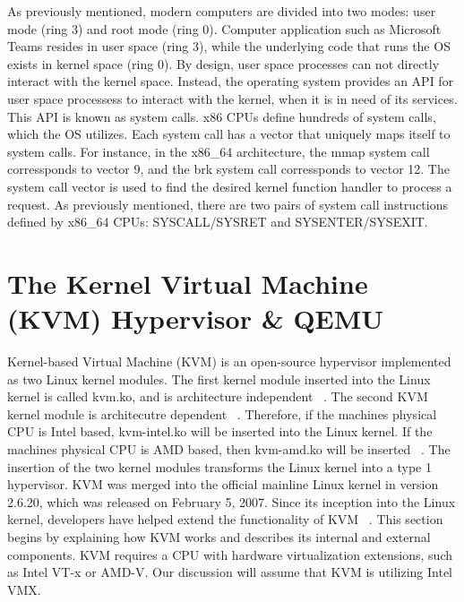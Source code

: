 \documentclass{report}
\begin{document}
\begin{spacing}{1.5}
{\large
As previously mentioned, modern computers are divided into two modes: user mode (ring 3) and root mode (ring 0). Computer application such as Microsoft Teams resides in user space (ring 3), while the underlying code that runs the OS exists in kernel space (ring 0). By design, user space processes can not directly interact with the kernel space. Instead, the operating system provides an API for user space processess to interact with the kernel, when it is in need of its services. This API is known as system calls. x86 CPUs define hundreds of system calls, which the OS utilizes. Each system call has a vector that uniquely maps itself to system calls. For instance, in the x86\_64 architecture, the mmap system call corressponds to vector 9, and the brk system call corressponds to vector 12. The system call vector is used to find the desired kernel function handler to process a  request. As previously mentioned, there are two pairs of system call instructions defined by x86\_64 CPUs: SYSCALL/SYSRET and SYSENTER/SYSEXIT.
\newline
}
























\section{The Kernel Virtual Machine (KVM) Hypervisor \& QEMU}


{\large 
Kernel-based Virtual Machine (KVM) is an open-source hypervisor implemented as two Linux kernel modules. The first kernel module inserted into the Linux kernel is called kvm.ko, and is architecture independent ~\cite{chirammal2016mastering}. The second KVM kernel module is architecutre dependent ~\cite{chirammal2016mastering}. Therefore, if the machines physical CPU is Intel based, kvm-intel.ko will be inserted into the Linux kernel. If the machines physical CPU is AMD based, then kvm-amd.ko will be inserted ~\cite{chirammal2016mastering}. The insertion of the two kernel modules transforms the Linux kernel into a type 1 hypervisor. KVM was merged into the official mainline Linux kernel in version 2.6.20, which was released on February 5, 2007. Since its inception into the Linux kernel, developers have helped extend the functionality of KVM ~\cite{goto2011kernel}. This section begins by explaining how KVM works and describes its internal and external components. KVM requires a CPU with hardware virtualization extensions, such as Intel VT-x or AMD-V. Our discussion will assume that KVM is utilizing Intel VMX.
\newline
}



\end{spacing}
\end{document}
